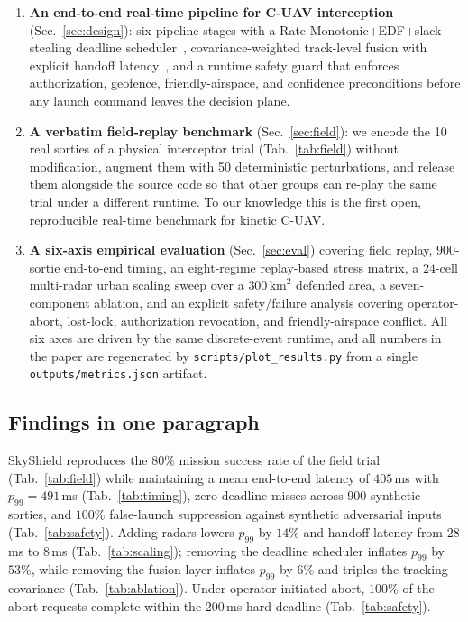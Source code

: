 \documentclass[conference]{IEEEtran}
\begin{document}
\begin{enumerate}
  \item \textbf{An end-to-end real-time pipeline for C-UAV interception}
        (Sec.~\ref{sec:design}): six pipeline stages with a
        Rate-Monotonic$+$EDF$+$slack-stealing deadline
        scheduler~\cite{liu1973scheduling,leung1982complexity,
        lehoczky1987enhanced,buttazzo2011hard}, covariance-weighted
        track-level fusion with explicit handoff
        latency~\cite{chang1997optimal,blom1988interacting,
        barshalom2001estimation}, and a runtime safety guard that enforces
        authorization, geofence, friendly-airspace, and confidence
        preconditions before any launch command leaves the decision plane.
  \item \textbf{A verbatim field-replay benchmark} (Sec.~\ref{sec:field}):
        we encode the 10 real sorties of a physical interceptor trial
        (Tab.~\ref{tab:field}) without modification, augment them with 50
        deterministic perturbations, and release them alongside the source
        code so that other groups can re-play the same trial under a
        different runtime.  To our knowledge this is the first open,
        reproducible real-time benchmark for kinetic C-UAV.
  \item \textbf{A six-axis empirical evaluation} (Sec.~\ref{sec:eval})
        covering field replay, $900$-sortie end-to-end timing, an
        eight-regime replay-based stress matrix, a $24$-cell multi-radar
        urban scaling sweep over a $300\,\text{km}^2$ defended area, a
        seven-component ablation, and an explicit safety/failure analysis
        covering operator-abort, lost-lock, authorization revocation, and
        friendly-airspace conflict.  All six axes are driven by the same
        discrete-event runtime, and all numbers in the paper are regenerated
        by \texttt{scripts/plot\_results.py} from a single
        \texttt{outputs/metrics.json} artifact.
\end{enumerate}

\subsection{Findings in one paragraph}
SkyShield reproduces the $80\%$ mission success rate of the field trial
(Tab.~\ref{tab:field}) while maintaining a mean end-to-end latency of
$405$\,ms with $p_{99}=491$\,ms (Tab.~\ref{tab:timing}), zero deadline
misses across 900 synthetic sorties, and $100\%$ false-launch suppression
against synthetic adversarial inputs (Tab.~\ref{tab:safety}).  Adding
radars lowers $p_{99}$ by $14\%$ and handoff latency from $28$\,ms to
$8$\,ms (Tab.~\ref{tab:scaling}); removing the deadline scheduler inflates
$p_{99}$ by $53\%$, while removing the fusion layer inflates $p_{99}$ by
$6\%$ and triples the tracking covariance (Tab.~\ref{tab:ablation}).  Under
operator-initiated abort, $100\%$ of the abort requests complete within
the 200\,ms hard deadline (Tab.~\ref{tab:safety}).
\end{document}
